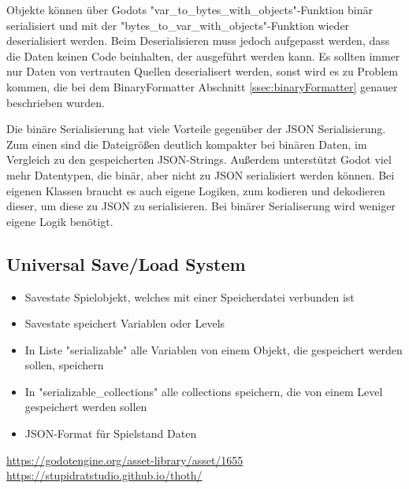 Objekte können über Godots "var\_to\_bytes\_with\_objects"-Funktion binär serialisiert und mit der "bytes\_to\_var\_with\_objects"-Funktion wieder deserialisiert werden. Beim Deserialisieren muss jedoch aufgepasst werden, dass die Daten keinen Code beinhalten, der ausgeführt werden kann. Es sollten immer nur Daten von vertrauten Quellen deserialisert werden, sonst wird es zu Problem kommen, die bei dem BinaryFormatter Abschnitt \ref{ssec:binaryFormatter} genauer beschrieben wurden.\cite{godotengineGlobalScope}

Die binäre Serialisierung hat viele Vorteile gegenüber der JSON Serialisierung. Zum einen sind die Dateigrößen deutlich kompakter bei binären Daten, im Vergleich zu den gespeicherten JSON-Strings. Außerdem unterstützt Godot viel mehr Datentypen, die binär, aber nicht zu JSON serialisiert werden können. Bei eigenen Klassen braucht es auch eigene Logiken, zum kodieren und dekodieren dieser, um diese zu JSON zu serialisieren. Bei binärer Serialiserung wird weniger eigene Logik benötigt.\cite{godotengineSavingGames}

\subsection{Universal Save/Load System}

\begin{itemize}
    \item Savestate Spielobjekt, welches mit einer Speicherdatei verbunden ist
    \item Savestate speichert Variablen oder Levels
    \item In Liste "serializable" alle Variablen von einem Objekt, die gespeichert werden sollen, speichern
    \item In "serializable\_collections" alle collections speichern, die von einem Level gespeichert werden sollen
    \item JSON-Format für Spielstand Daten
\end{itemize}

\url{https://godotengine.org/asset-library/asset/1655}\\
\url{https://stupidratstudio.github.io/thoth/}